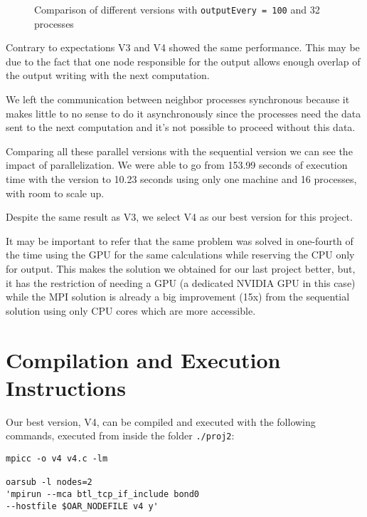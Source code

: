 \documentclass[conference]{IEEEtran}
\begin{document}
\begin{figure}[ht]
  \centering
  \caption{Comparison of different versions with \texttt{outputEvery = 100} and 32 processes}
  \label{fig:executionTimeManyOutputs}
\end{figure}

Contrary to expectations V3 and V4 showed the same performance. This may be due to the fact that one node responsible for the output allows enough overlap of the output writing with the next computation.

We left the communication between neighbor processes synchronous because it makes little to no sense to do it asynchronously since the processes need the data sent to the next computation and it's not possible to proceed without this data.

Comparing all these parallel versions with the sequential version we can see the impact of parallelization. We were able to go from 153.99 seconds of execution time with the version to 10.23 seconds using only one machine and 16 processes, with room to scale up.

Despite the same result as V3, we select V4 as our best version for this project.

It may be important to refer that the same problem was solved in one-fourth of the time using the GPU for the same calculations while reserving the CPU only for output. This makes the solution we obtained for our last project better, but, it has the restriction of needing a GPU (a dedicated NVIDIA GPU in this case) while the MPI solution is already a big improvement (15x) from the sequential solution using only CPU cores which are more accessible.

\section{Compilation and Execution Instructions}
Our best version, V4, can be compiled and executed with the following commands, executed from inside the folder \texttt{./proj2}:
\begin{verbatim}
mpicc -o v4 v4.c -lm

oarsub -l nodes=2
'mpirun --mca btl_tcp_if_include bond0
--hostfile $OAR_NODEFILE v4 y'
\end{verbatim}
\end{document}
